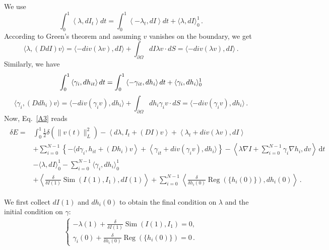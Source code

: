 \documentclass{article}
\numberwithin{equation}{section}
\let\on=\operatorname
\newcommand{\ud}{\,\mathrm{d}}
\begin{document}
We use 
\begin{equation}\label{A4}
\int_{0}^{1}\left\langle\lambda, d I_{t}\right\rangle d t=\int_{0}^{1}\left\langle-\lambda_{t}, d I\right\rangle d t+\langle\lambda, d I\rangle_{0}^{1}\,.
\end{equation}
According to Green's theorem and assuming $v$ vanishes on the boundary, we get
\begin{equation}\label{A5}
\langle\lambda,(D d I) v\rangle=\langle- d i v(\lambda v), d I\rangle+\int_{\partial \Omega} d I \lambda v \cdot d S=\langle- d i v(\lambda v), d I\rangle\,.
\end{equation}
Similarly, we have
\begin{equation}\label{A6}
\int_{0}^{1}\left\langle\gamma_i, d h_{it}\right\rangle d t=\int_{0}^{1}\left\langle-\gamma_{it}, d h_i\right\rangle d t+\langle\gamma_i, d h_i\rangle_{0}^{1}\\
\end{equation}
\begin{equation}\label{A7}
\langle\gamma_i,(D d h_i) v\rangle=\langle- d i v(\gamma_i v), d h_i\rangle+\int_{\partial \Omega} d h_i \gamma_i v \cdot d S=\langle- d i v(\gamma_i v), d h_i\rangle \,.
\end{equation}
Now, Eq.~\eqref{A3} reads
\begin{align}
\begin{split}
 \delta E = &\int_0^1   \frac 12 \delta( \|v(t) \|^2_L)  -\left\langle d\lambda,I_t+ (D I ) v \right\rangle
 +\left\langle \lambda_t + div(\lambda v), dI\right\rangle\\
 &+\sum_{i=0}^{N-1}\left\{-\langle d\gamma_i, h_{it}+ (Dh_i) v \right\rangle + \left\langle\gamma_{it} + div(\gamma_i v), dh_i\rangle\right\}  -\left\langle \lambda \nabla I + \sum_{i=0}^{N-1}\gamma_i\nabla h_i, dv\right\rangle \ud t \\
 & -\langle \lambda, dI \rangle^1_0 - \sum_{i=0}^{N-1}\langle\gamma_i, dh_i\rangle^1_0\\
 &+\left\langle\frac{\delta}{\delta I(1)}\on{Sim}(I(1),I_1),dI(1)\right\rangle + \sum_{i=0}^{N-1}\left\langle\frac{\delta}{\delta h_i(0)}\on{Reg}(\{h_i(0)\}),dh_i(0)\right\rangle\,.
\end{split}
\end{align}

We first collect $dI(1)$ and $dh_i(0)$ to obtain the final condition on $\lambda$ and the initial condition on $\gamma$:
\begin{align}
\begin{cases}
-\lambda(1) +  \frac{\delta}{\delta I(1)}\on{Sim}(I(1),I_1) = 0,\\
\gamma_i(0) +\frac{\delta}{\delta h_i(0)}\on{Reg}(\{h_i(0)\}) = 0\,.
\end{cases}
\end{align}
\end{document}
